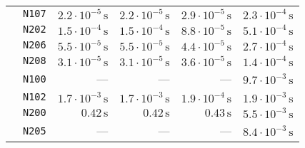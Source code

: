 \begin{tabular}{cc|rrrr}
 & \texttt{\footnotesize                 N107} & $ 2.2\cdot 10^{-5}\,\text{s}$ & $ 2.2\cdot 10^{-5}\,\text{s}$ & $ 2.9\cdot 10^{-5}\,\text{s}$ & $ 2.3\cdot 10^{-4}\,\text{s}$\\
 & \texttt{\footnotesize                 N202} & $ 1.5\cdot 10^{-4}\,\text{s}$ & $ 1.5\cdot 10^{-4}\,\text{s}$ & $ 8.8\cdot 10^{-5}\,\text{s}$ & $ 5.1\cdot 10^{-4}\,\text{s}$\\
 & \texttt{\footnotesize                 N206} & $ 5.5\cdot 10^{-5}\,\text{s}$ & $ 5.5\cdot 10^{-5}\,\text{s}$ & $ 4.4\cdot 10^{-5}\,\text{s}$ & $ 2.7\cdot 10^{-4}\,\text{s}$\\
 & \texttt{\footnotesize                 N208} & $ 3.1\cdot 10^{-5}\,\text{s}$ & $ 3.1\cdot 10^{-5}\,\text{s}$ & $ 3.6\cdot 10^{-5}\,\text{s}$ & $ 1.4\cdot 10^{-4}\,\text{s}$\\
 & \texttt{\footnotesize                 N100} &                             — &                             — &                             — & $ 9.7\cdot 10^{-3}\,\text{s}$\\
 & \texttt{\footnotesize                 N102} & $ 1.7\cdot 10^{-3}\,\text{s}$ & $ 1.7\cdot 10^{-3}\,\text{s}$ & $ 1.9\cdot 10^{-4}\,\text{s}$ & $ 1.9\cdot 10^{-3}\,\text{s}$\\
 & \texttt{\footnotesize                 N200} & $             0.42\,\text{s}$ & $             0.42\,\text{s}$ & $             0.43\,\text{s}$ & $ 5.5\cdot 10^{-3}\,\text{s}$\\
 & \texttt{\footnotesize                 N205} &                             — &                             — &                             — & $ 8.4\cdot 10^{-3}\,\text{s}$\\
\end{tabular}
